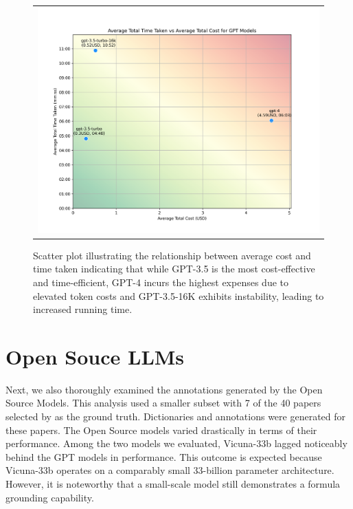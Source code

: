 \begin{figure}[htbp]
  \centering
  \begin{tabular}{c}
  \includegraphics[width=14cm]{images/gpt-time-v-cost.png}
  \end{tabular}
  \caption[Cost vs Time]{Scatter plot illustrating the relationship between average cost and time taken indicating that while GPT-3.5 is the most cost-effective and time-efficient, GPT-4 incurs the highest expenses due to elevated token costs and GPT-3.5-16K exhibits instability, leading to increased running time.}\label{fig:gpt-time-v-cost}
\end{figure}


\section{Open Souce LLMs}

Next, we also thoroughly examined the annotations generated by the Open Source Models. This analysis used a smaller subset with 7 of the 40 papers selected by \citet{asakura2022building} as the ground truth. Dictionaries and annotations were generated for these papers. The Open Source models varied drastically in terms of their performance. Among the two models we evaluated, Vicuna-33b lagged noticeably behind the GPT models in performance. This outcome is expected because Vicuna-33b operates on a comparably small 33-billion parameter architecture. However, it is noteworthy that a small-scale model still demonstrates a formula grounding capability.

